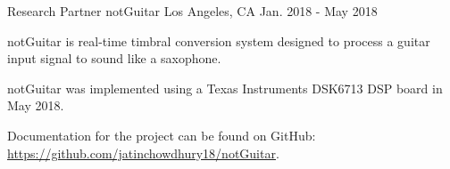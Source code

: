 \begin{cventries}
    \cventry
    {Research Partner} %
    {notGuitar} %
    {Los Angeles, CA} %
    {Jan. 2018 - May 2018} %
    {
      \begin{cvitems} %
        \item {notGuitar is real-time timbral conversion system designed to process a guitar input signal to sound like a saxophone.}
        \item {notGuitar was implemented using a Texas Instruments DSK6713 DSP board in May 2018.}
        \item {Documentation for the project can be found on GitHub: \url{https://github.com/jatinchowdhury18/notGuitar}.}
      \end{cvitems}
    }

\end{cventries}
